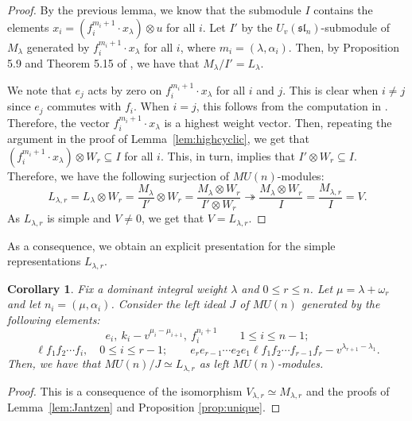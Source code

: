 \documentclass{amsart}
\numberwithin{equation}{section}
\theoremstyle{theorem}
\newtheorem{corollary}[theorem]{Corollary}
\theoremstyle{definition}
\newcommand{\sub}{\subseteq}
\newcommand{\sll}{\mathfrak{sl}}
\newcommand{\uvsln}{U_v(\sll_n)}
\begin{document}
\begin{proof}
By the previous lemma, we know that the submodule $I$ contains the elements $x_i=(f_i^{m_i+1}\cdot x_{\lambda})\otimes u$ for all $i$. Let $I'$ by the $\uvsln$-submodule of $M_{\lambda}$ generated by $f_i^{m_i+1}\cdot x_{\lambda}$ for all $i$, where $m_i=(\lambda,\alpha_i)$. Then, by Proposition 5.9 and Theorem 5.15 of \cite{J}, we have that $M_{\lambda}/I' = L_{\lambda}$.

We note that $e_j$ acts by zero on $f_i^{m_i+1}\cdot x_{\lambda}$ for all $i$ and $j$. This is clear when $i\neq j$ since $e_j$ commutes with $f_i$. When $i=j$, this follows from the computation in \cite[Lemma 5.6]{J}. Therefore, the vector $f_i^{m_i+1}\cdot x_{\lambda}$ is a highest weight vector. Then, repeating the argument in the proof of Lemma~\ref{lem:highcyclic}, we get that $(f_i^{m_i+1}\cdot x_{\lambda}) \otimes W_r \sub I$ for all $i$. This, in turn, implies that $I' \otimes W_r\sub I$. Therefore, we have the following surjection of $MU(n)$-modules:
\[L_{\lambda,r} = L_{\lambda} \otimes W_r = \frac{M_{\lambda}}{I'} \otimes W_r  =\frac{M_{\lambda} \otimes W_r}{I'\otimes W_r} \twoheadrightarrow \frac{M_{\lambda} \otimes W_r}{I}=\frac{M_{\lambda,r}}{I} =  V.\]
As $L_{\lambda,r}$ is simple and $V\neq 0$, we get that $V=L_{\lambda,r}$.
\end{proof}

As a consequence, we obtain %
an explicit presentation for the simple representations $L_{\lambda, r}$.

\begin{corollary} \label{cor:exppresent}
Fix a dominant integral weight $\lambda$  and $0\leq r\leq n$. Let $\mu=\lambda+\omega_r$ and let $n_i=(\mu, \alpha_i)$. Consider the left ideal $J$ of $MU(n)$ generated by the following elements:
\[e_i,~k_i -v^{\mu_i-\mu_{i+1}}, ~f_i^{n_i+1}\qquad 1\leq i\leq n-1;\]
\[\ell f_1f_2\cdots f_{i},\quad0\leq i\leq r-1;\qquad e_{r}e_{r - 1}\cdots e_2e_1 \ell f_1 f_2\cdots f_{r-1} f_{r}-v^{\lambda_{r+1}-\lambda_1}.\]
Then, we have that $MU(n)/J \simeq L_{\lambda, r}$ as left $MU(n)$-modules.
\end{corollary}

\begin{proof}
This is a consequence of the isomorphism $V_{\lambda, r}\simeq M_{\lambda, r}$ and the proofs of Lemma~\ref{lem:Jantzen} and Proposition \ref{prop:unique}.
\end{proof}
\end{document}
